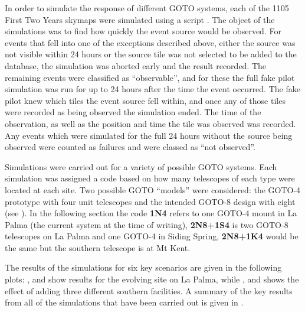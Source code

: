 \begin{colsection}
\begin{colsection}
In order to simulate the response of different GOTO systems, each of the 1105 First Two Years skymaps \citep{First2Years} were simulated using a script . The object of the simulations was to find how quickly the event source would be observed. For events that fell into one of the exceptions described above, either the source was not visible within 24 hours or the source tile was not selected to be added to the database, the simulation was aborted early and the result recorded. The remaining events were classified as ``observable'', and for these the full fake pilot simulation was run for up to 24 hours after the time the event occurred. The fake pilot knew which tiles the event source fell within, and once any of those tiles were recorded as being observed the simulation ended. The time of the observation, as well as the position and time the tile was observed was recorded. Any events which were simulated for the full 24 hours without the source being observed were counted as failures and were classed as ``not observed''.

Simulations were carried out for a variety of possible GOTO systems. Each simulation was assigned a code based on how many telescopes of each type were located at each site. Two possible GOTO ``models'' were considered: the GOTO-4 prototype with four unit telescopes and the intended GOTO-8 design with eight (see ). In the following section the code \textbf{1N4} refers to one GOTO-4 mount in La Palma (the current system at the time of writing), \textbf{2N8+1S4} is two GOTO-8 telescopes on La Palma and one GOTO-4 in Siding Spring, \textbf{2N8+1K4} would be the same but the southern telescope is at Mt Kent.

The results of the simulations for six key scenarios are given in the following plots: ,  and  show results for the evolving site on La Palma, while ,  and  shows the effect of adding three different southern facilities. A summary of the key results from all of the simulations that have been carried out is given in .

\newpage


\end{colsection}
\end{colsection}
